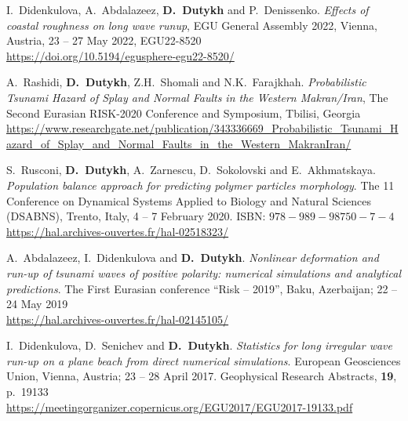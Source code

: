 \documentclass[final, a4paper, oneside, 12pt]{article}
\numberwithin{equation}{section}
\begin{document}
\begin{etaremune}
  \item I.~Didenkulova, A.~Abdalazeez, \textbf{D.~Dutykh} and P.~Denissenko. \textit{Effects of coastal roughness on long wave runup}, EGU General Assembly 2022, Vienna, Austria, 23 -- 27 May 2022, EGU22-8520 \\
  \url{https://doi.org/10.5194/egusphere-egu22-8520/}


  
  \item A.~Rashidi, \textbf{D.~Dutykh}, Z.H.~Shomali and N.K.~Farajkhah. \textit{Probabilistic Tsunami Hazard of Splay and Normal Faults in the Western Makran/Iran}, The Second Eurasian RISK-2020 Conference and Symposium, Tbilisi, Georgia \\ %
  \url{https://www.researchgate.net/publication/343336669_Probabilistic_Tsunami_Hazard_of_Splay_and_Normal_Faults_in_the_Western_MakranIran/}
  
  \item S.~Rusconi, \textbf{D.~Dutykh}, A.~Zarnescu, D.~Sokolovski and E.~Akhmatskaya. \textit{Population balance approach for predicting polymer particles morphology}. The 11 Conference on Dynamical Systems Applied to Biology and Natural Sciences (DSABNS), Trento, Italy, 4 -- 7 February 2020. ISBN: $978-989-98750-7-4$ \\ %
  \url{https://hal.archives-ouvertes.fr/hal-02518323/}



  \item A.~Abdalazeez, I.~Didenkulova and \textbf{D.~Dutykh}. \textit{Nonlinear deformation and run-up of tsunami waves of positive polarity: numerical simulations and analytical predictions}. The First Eurasian conference ``Risk -- 2019'', Baku, Azerbaijan; 22 -- 24 May 2019 \\ %
  \url{https://hal.archives-ouvertes.fr/hal-02145105/}
  


  \item I.~Didenkulova, D.~Senichev and \textbf{D.~Dutykh}. \textit{Statistics for long irregular wave run-up on a plane beach from direct numerical simulations}. European Geosciences Union, Vienna, Austria; 23 -- 28 April 2017. Geophysical Research Abstracts, \textbf{19}, p.~19133 \\ %
  \url{https://meetingorganizer.copernicus.org/EGU2017/EGU2017-19133.pdf}
  

\end{etaremune}
\end{document}
